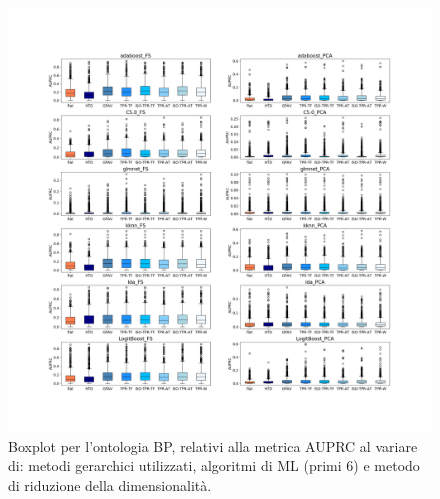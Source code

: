 \documentclass[12pt]{report}
\begin{document}
\begin{appendices}
\begin{figure}[h]
 \hspace*{-2.6cm}
\includegraphics[scale=0.34]{./images/BP_PRC_1.png}
\caption{\footnotesize{Boxplot per l'ontologia BP, relativi alla metrica AUPRC al variare di: metodi gerarchici utilizzati, algoritmi di ML (primi 6) e metodo di riduzione della dimensionalità.}}
\label{BP_PRC_1}
\end{figure}



\end{appendices}
\end{document}
